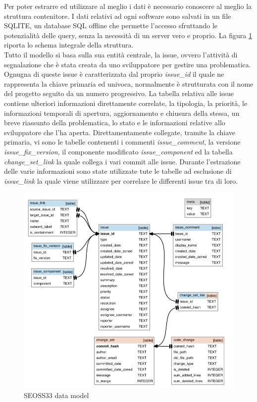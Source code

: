 \documentclass[%
    corpo=12pt,
    twoside,
    oldstyle,
    autoretitolo,
    greek,
    evenboxes,
]{toptesi}
\begin{document}
Per poter estrarre ed utilizzare al meglio i dati è necessario conoscere al meglio la struttura contenitore.
I dati relativi ad ogni software sono salvati in un file SQLITE, un database SQL offline che permette l'accesso sfruttando le potenzialità delle query, senza la necessità di un server vero e proprio. La figura \ref{fig:seoss33_db} riporta lo schema integrale della struttura.\\
Tutto il modello si basa sulla sua entità centrale, la issue, ovvero l'attività di segnalazione che è stata creata da uno sviluppatore per gestire una problematica. Ognugna di queste issue è caratterizzata dal proprio \textit{issue\_id} il quale ne rappresenta la chiave primaria ed univoca, normalmente è strutturata con il nome del progetto seguito da un numero progressivo. La tabella relativa alle issue contiene ulteriori informazioni direttamente correlate, la tipologia, la priorità, le informazioni temporali di apertura, aggiornamento e chiusura della stessa, un breve riassunto della problematica, lo stato e le informazioni relative allo sviluppatore che l'ha aperta. Direttamentamente collegate, tramite la chiave primaria, vi sono le tabelle contenenti i commenti \textit{issue\_comment}, la versione \textit{issue\_fix\_version}, il componente modificato \textit{issue\_component} ed la tabella \textit{change\_set\_link} la quale collega i vari commit alle issue. Durante l'estrazione delle varie informazioni sono state utilizzate tute le tabelle ad esclusione di \textit{issue\_link} la quale viene utilizzare per correlare le differenti issue tra di loro.

\begin{figure}[!ht]
  \includegraphics[width=\linewidth]{figure/seoss33_db_schema.png}
  \caption{SEOSS33 data model}
  \label{fig:seoss33_db}
\end{figure}
\end{document}
